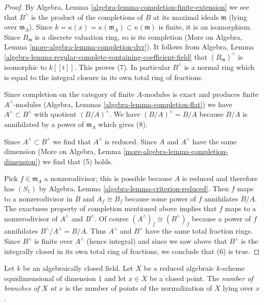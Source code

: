 \begin{proof}
\medskip\noindent
By Algebra, Lemma \ref{algebra-lemma-completion-finite-extension}
we see that $B^\wedge$ is the product of the completions of $B$
at its maximal ideals $\mathfrak m$ (lying over $\mathfrak m_A$).
Since $k = \kappa(x) = \kappa(\mathfrak m_A) \subset \kappa(\mathfrak m)$
is finite, it is an isomorphism. Since $B_\mathfrak m$ is a discrete
valuation ring, so is its completion
(More on Algebra, Lemma \ref{more-algebra-lemma-completion-dvr}).
It follows from
Algebra, Lemma \ref{algebra-lemma-regular-complete-containing-coefficient-field}
that $(B_\mathfrak m)^\wedge$ is isomorphic to $k[[t]]$.
This proves (7).
In particular $B^\wedge$ is a normal ring which is equal to the integral
closure in its own total ring of fractions.

\medskip\noindent
Since completion on the category of finite $A$-modules is exact and
produces finite $A^\wedge$-modules
(Algebra, Lemmas \ref{algebra-lemma-completion-flat})
we have $A^\wedge \subset B^\wedge$
with quotient $(B/A)^\wedge$. We have
$(B/A)^\wedge = B/A$ because $B/A$ is annihilated by a power of
$\mathfrak m_A$ which gives (8).

\medskip\noindent
Since $A^\wedge \subset B^\wedge$ we find that $A^\wedge$ is reduced.
Since $A$ and $A^\wedge$ have the same dimension
(More on Algebra, Lemma \ref{more-algebra-lemma-completion-dimension})
we find that (5) holds.

\medskip\noindent
Pick $f \in \mathfrak m_A$ a nonzerodivisor; this is possible because
$A$ is reduced and therefore has $(S_1)$ by
Algebra, Lemma \ref{algebra-lemma-criterion-reduced}.
Then $f$ maps to a nonzerodivisor
in $B$ and $A_f \cong B_f$ because some power of $f$ annihilates $B/A$.
The exactness property of completion mentioned above implies
that $f$ maps to a nonzerodivisor of $A^\wedge$ and $B^\wedge$.
Of course $(A^\wedge)_f \cong (B^\wedge)_f$ because a power of $f$
annihilates $B^\wedge/A^\wedge = B/A$. Thus
$A^\wedge$ and $B^\wedge$ have the same total fraction rings.
Since $B^\wedge$ is finite over $A^\wedge$ (hence integral)
and since we saw above that $B^\wedge$ is the integrally closed
in its own total ring of fractions, we conclude that (6) is true.
\end{proof}

\begin{definition}
\label{definition-number-of-branches}
Let $k$ be an algebraically closed field. Let $X$ be a reduced
algebraic $k$-scheme equidimensional of dimension $1$ and let
$x \in X$ be a closed point. The {\it number of branches of $X$ at $x$} is
the number of points of the normalization of $X$ lying over $x$.
\end{definition}

